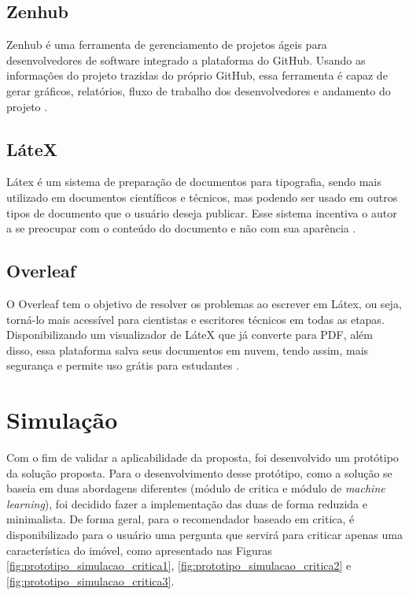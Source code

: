 \subsection{Zenhub}

Zenhub é uma ferramenta de gerenciamento de projetos ágeis para desenvolvedores de software integrado a plataforma do GitHub. Usando as informações do projeto trazidas do próprio GitHub, essa ferramenta é capaz de gerar gráficos, relatórios, fluxo de trabalho dos desenvolvedores e andamento do projeto \cite{zenhub:2019}.

\subsection{LáteX}

Látex é um sistema de preparação de documentos para tipografia, sendo mais utilizado em documentos científicos e técnicos, mas podendo ser usado em outros tipos de documento que o usuário deseja publicar. Esse sistema incentiva o autor a se preocupar com o conteúdo do documento e não com sua aparência \cite{latex:2019}.

\subsection{Overleaf}

O Overleaf tem o objetivo de resolver os problemas ao escrever em Látex, ou seja, torná-lo mais acessível para cientistas e escritores técnicos em todas as etapas. Disponibilizando um visualizador de LáteX que já converte para PDF, além disso, essa plataforma salva seus documentos em nuvem, tendo assim, mais segurança e permite uso grátis para estudantes \cite{overleaf:2019}.

\section{Simulação}

Com o fim de validar a aplicabilidade da proposta, foi desenvolvido um protótipo da solução proposta. Para o desenvolvimento desse protótipo, como a solução se baseia em duas abordagens diferentes (módulo de critica e módulo de \textit{machine learning}), foi decidido fazer a implementação das duas de forma reduzida e minimalista. De forma geral, para o recomendador baseado em critica, é disponibilizado para o usuário uma pergunta que servirá para criticar apenas uma característica do imóvel, como apresentado nas Figuras \ref{fig:prototipo_simulacao_critica1}, \ref{fig:prototipo_simulacao_critica2} e \ref{fig:prototipo_simulacao_critica3}.


